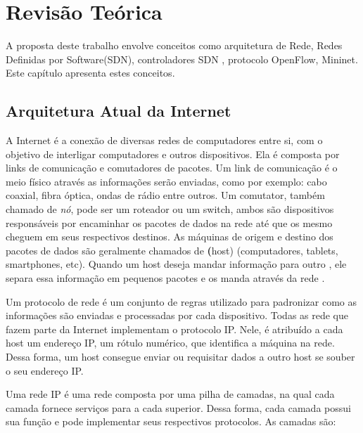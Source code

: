 \frenchspacing 
\chapter{Revisão Teórica}
A proposta deste trabalho envolve conceitos como arquitetura de Rede, Redes Definidas por Software(SDN), controladores SDN , protocolo OpenFlow, Mininet. Este capítulo apresenta estes conceitos.

\section{Arquitetura Atual da Internet}
A Internet é a conexão de diversas redes de computadores entre si, com o objetivo de interligar computadores e outros dispositivos. Ela é composta por links de comunicação e comutadores de pacotes. Um link de comunicação é o meio físico através as informações serão enviadas, como por exemplo: cabo coaxial, fibra óptica, ondas de rádio entre outros. Um comutator, também chamado de \textit{nó}, pode ser um roteador ou um switch, ambos são dispositivos responsáveis por encaminhar os pacotes de dados na rede até que os mesmo cheguem em seus respectivos destinos. As máquinas de origem e destino dos pacotes de dados são geralmente chamados de \textbf(host) (computadores, tablets, smartphones, etc). Quando um host deseja mandar informação para outro , ele separa essa informação em pequenos pacotes e os manda através da rede \cite{topdownapp}.

Um protocolo de rede é um conjunto de regras utilizado para padronizar como as informações são enviadas e processadas por cada dispositivo. Todas as rede que fazem parte da Internet implementam o protocolo IP. Nele, é atribuído a cada host um endereço IP, um rótulo numérico, que identifica a máquina na rede. Dessa forma, um host consegue enviar ou requisitar dados a outro host se souber o seu endereço IP.

Uma rede IP é uma rede composta por uma pilha de camadas, na qual cada camada fornece serviços para a cada superior. Dessa forma, cada camada possui sua função e pode implementar seus respectivos protocolos\cite{topdownapp}. As camadas são:

